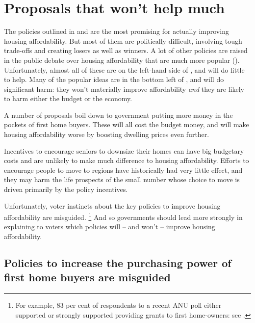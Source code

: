 \chapter{Proposals that won't help much}\label{chap:proposals-that-wont-help-much}

The policies outlined in  and  are the most promising for actually improving housing affordability.
But most of them are politically difficult, involving tough trade-offs and creating losers as well as winners.
A lot of other policies are raised in the public debate over housing affordability that are much more popular ().
Unfortunately, almost all of these are on the left-hand side of , and will do little to help.
Many of the popular ideas are in the bottom left of , and will do significant harm: they won't materially improve affordability \emph{and} they are likely to harm either the budget or the economy.

A number of proposals boil down to government putting more money in the pockets of first home buyers.
These will all cost the budget money, and will make housing affordability worse by boosting dwelling prices even further.

Incentives to encourage seniors to downsize their homes can have big budgetary costs and are unlikely to make much difference to housing affordability.
Efforts to encourage people to move to regions have historically had very little effect, and they may harm the life prospects of the small number whose choice to move is driven primarily by the policy incentives.

Unfortunately, voter instincts about the key policies to improve housing affordability are misguided.%
	\footnote{For example, 83 per cent of respondents to a recent ANU poll either supported or strongly supported providing grants to first home-owners: see .}
And so governments should lead more strongly in explaining to voters which policies will -- and won't -- improve housing affordability.

\section{Policies to increase the purchasing power of first home buyers are misguided}\label{sec:policies-to-increase-the-buying-power-of-first-home-purchasers-are-misguided}

